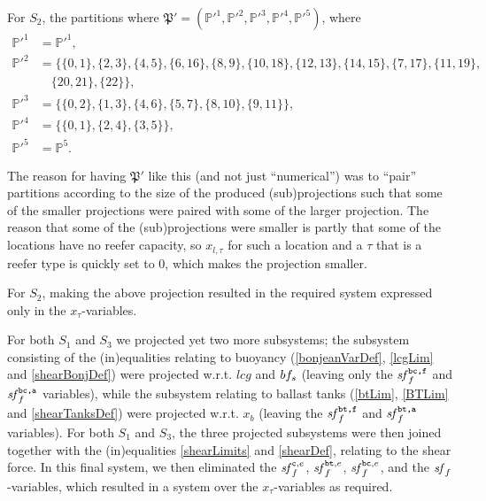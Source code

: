 For $S_2$, the partitions where $\mathfrak{P}' = (\mathbb{P}'^1, \mathbb{P}'^2, \mathbb{P}'^3, \mathbb{P}'^4, \mathbb{P}'^5)$, where 
\begin{align*}
\mathbb{P}'^1 &= \mathbb{P}'^1,\\  
\mathbb{P}'^2 &= \big\{ \{0,1\}, \{2,3\}, \{4,5\}, \{6,16\}, \{8,9\}, \{10,18\}, \{12,13\}, \{14,15\}, \{7,17\},
						   \{11,19\},\\
							& \quad \{20,21\}, \{22\} \big\},\\
\mathbb{P}'^3 &= \big\{ \{0,2\}, \{1,3\}, \{4,6\}, \{5,7\}, \{8,10\}, \{9,11\} \big\},\\
\mathbb{P}'^4 &= \big\{ \{0,1\}, \{2,4\}, \{3,5\} \big\},\\
\mathbb{P}'^5 & = \mathbb{P}^5.
\end{align*}

The reason for having $\mathfrak{P}'$ like this (and not just ``numerical'') was to ``pair'' partitions according to the size of the produced (sub)projections such that some of the smaller projections were paired with some of the larger projection. The reason that some of the (sub)projections were smaller is partly that some of the locations have no reefer capacity, so $x_{l,\tau}$ for such a location and a $\tau$ that is a reefer type is quickly set to $0$, which makes the projection smaller.

For $S_2$, making the above projection resulted in the required system expressed only in the $x_\tau$-variables.

For both $S_1$ and $S_3$ we projected yet two more subsystems; the subsystem consisting of the (in)equalities relating to buoyancy (\eqref{bonjeanVarDef}, \eqref{lcgLim}  and \eqref{shearBonjDef}) were projected w.r.t. $lcg$ and $bf_s$ (leaving only the $\mathit{sf}^{\texttt{bc,f}}_f$ and $\mathit{sf}^{\texttt{bc,a}}_f$ variables), while the subsystem relating to ballast tanks (\eqref{btLim}, \eqref{BTLim} and \eqref{shearTanksDef}) were projected w.r.t. $x_b$ (leaving the $\mathit{sf}^{\texttt{bt,f}}_f$ and $\mathit{sf}^{\texttt{bt,a}}_f$ variables). 
For both $S_1$ and $S_3$, the three projected subsystems were then joined together with the (in)equalities \eqref{shearLimits} and \eqref{shearDef}, relating to the shear force. In this final system, we then eliminated the $\mathit{sf}^{\texttt{c},e}_f$, $\mathit{sf}^{\texttt{bt},e}_f$, $\mathit{sf}^{\texttt{bc},e}_f$, and the $\mathit{sf}_f$-variables, which resulted in a system over the $x_\tau$-variables as required. 


